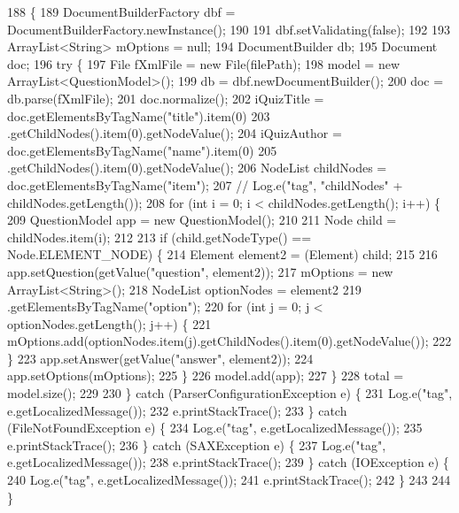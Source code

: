 \begin{DoxyCode}
188                                          \{
189         DocumentBuilderFactory dbf = DocumentBuilderFactory.newInstance();
190 
191         dbf.setValidating(\textcolor{keyword}{false});
192 
193         ArrayList<String> mOptions = null;
194         DocumentBuilder db;
195         Document doc;
196         \textcolor{keywordflow}{try} \{
197             File fXmlFile = \textcolor{keyword}{new} File(filePath);
198             model = \textcolor{keyword}{new} ArrayList<QuestionModel>();
199             db = dbf.newDocumentBuilder();
200             doc = db.parse(fXmlFile);
201             doc.normalize();
202             iQuizTitle = doc.getElementsByTagName(\textcolor{stringliteral}{"title"}).item(0)
203                     .getChildNodes().item(0).getNodeValue();
204             iQuizAuthor = doc.getElementsByTagName(\textcolor{stringliteral}{"name"}).item(0)
205                     .getChildNodes().item(0).getNodeValue();
206             NodeList childNodes = doc.getElementsByTagName(\textcolor{stringliteral}{"item"});
207             \textcolor{comment}{// Log.e("tag", "childNodes" + childNodes.getLength());}
208             \textcolor{keywordflow}{for} (\textcolor{keywordtype}{int} i = 0; i < childNodes.getLength(); i++) \{
209                 QuestionModel app = \textcolor{keyword}{new} QuestionModel();
210 
211                 Node child = childNodes.item(i);
212 
213                 \textcolor{keywordflow}{if} (child.getNodeType() == Node.ELEMENT\_NODE) \{
214                     Element element2 = (Element) child;
215 
216                     app.setQuestion(getValue(\textcolor{stringliteral}{"question"}, element2));
217                     mOptions = \textcolor{keyword}{new} ArrayList<String>();
218                     NodeList optionNodes = element2
219                             .getElementsByTagName(\textcolor{stringliteral}{"option"});
220                     \textcolor{keywordflow}{for} (\textcolor{keywordtype}{int} j = 0; j < optionNodes.getLength(); j++) \{
221                         mOptions.add(optionNodes.item(j).getChildNodes().item(0).getNodeValue());
222                     \}
223                     app.setAnswer(getValue(\textcolor{stringliteral}{"answer"}, element2));
224                     app.setOptions(mOptions);
225                 \}
226                 model.add(app);
227             \}
228             total = model.size();
229 
230         \} \textcolor{keywordflow}{catch} (ParserConfigurationException e) \{
231             Log.e(\textcolor{stringliteral}{"tag"}, e.getLocalizedMessage());
232             e.printStackTrace();
233         \} \textcolor{keywordflow}{catch} (FileNotFoundException e) \{
234             Log.e(\textcolor{stringliteral}{"tag"}, e.getLocalizedMessage());
235             e.printStackTrace();
236         \} \textcolor{keywordflow}{catch} (SAXException e) \{
237             Log.e(\textcolor{stringliteral}{"tag"}, e.getLocalizedMessage());
238             e.printStackTrace();
239         \} \textcolor{keywordflow}{catch} (IOException e) \{
240             Log.e(\textcolor{stringliteral}{"tag"}, e.getLocalizedMessage());
241             e.printStackTrace();
242         \}
243 
244     \}
\end{DoxyCode}
